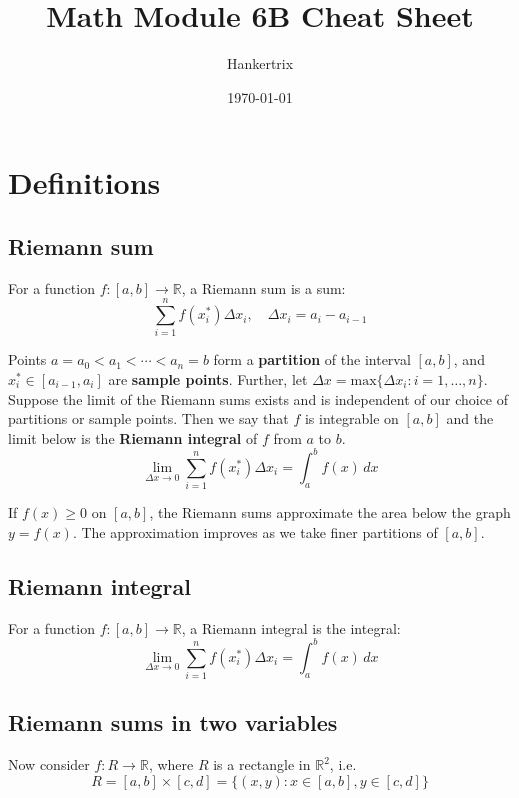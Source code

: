 \documentclass[11pt]{article}
\author{Hankertrix}
\date{\today}
\title{Math Module 6B Cheat Sheet}
\begin{document}
\maketitle
\setcounter{tocdepth}{2}
\tableofcontents \clearpage
\section{Definitions}
\label{sec:org4793dc1}

\subsection{Riemann sum}
\label{sec:orgf7fa42f}
For a function \(f : [a, b] \rightarrow \mathbb{R}\), a Riemann sum is a sum:
\[\sum_{i = 1}^n f(x_i^*) \Delta x_i, \quad \Delta x_i = a_i - a_{i - 1}\]

Points \(a = a_0 < a_1 < \cdots < a_n = b\) form a \textbf{partition} of the interval \([a, b]\), and \(x_i^* \in [a_{i - 1}, a_i]\) are \textbf{sample points}. Further, let \(\Delta x = \text{max} \{\Delta x_i : i = 1, \ldots, n\}\). Suppose the limit of the Riemann sums exists and is independent of our choice of partitions or sample points. Then we say that \(f\) is integrable on \([a, b]\) and the limit below is the \textbf{Riemann integral} of \(f\) from \(a\) to \(b\).
\[\lim_{\Delta x \rightarrow 0} \sum_{i = 1}^n f(x_i^*) \Delta x_i = \int_a^b f(x) \, dx\]

If \(f(x) \ge 0\) on \([a, b]\), the Riemann sums approximate the area below the graph \(y = f(x)\). The approximation improves as we take finer partitions of \([a, b]\).

\subsection{Riemann integral}
\label{sec:orgffa2999}
For a function \(f : [a, b] \rightarrow \mathbb{R}\), a Riemann integral is the integral:
\[\lim_{\Delta x \rightarrow 0} \sum_{i = 1}^n f(x_i^*) \Delta x_i = \int_a^b f(x) \, dx\]

\newpage

\subsection{Riemann sums in two variables}
\label{sec:orgbef038a}
Now consider \(f : R \rightarrow \mathbb{R}\), where \(R\) is a rectangle in \(\mathbb{R}^2\), i.e.
\[R = [a, b] \times [c, d] = \{(x, y) : x \in [a, b], y \in [c, d]\}\]
\end{document}
